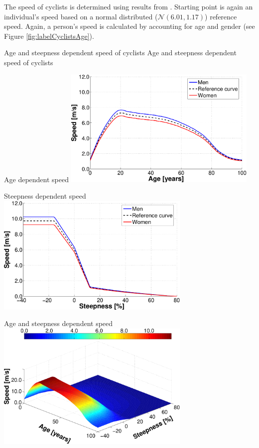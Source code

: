 The speed of cyclists is determined using results from \cite{ParkinRotheram_TPol_2010}. Starting point is again an individual's speed based on a normal distributed ($\mathcal{N}(6.01,1.17)$) reference speed. Again, a person's speed is calculated by accounting for age and gender (see Figure \ref{fig:labelCyclistsAge}).

\createfigure%
{Age and steepness dependent speed of cyclists}%
{Age and steepness dependent speed of cyclists}%
{\label{fig:labelBikeTravelTimes}}%
{%
  \createsubfigure%
  {Age dependent speed}%
  {\includegraphics[width=0.70\textwidth, angle=0]{extending/figures/MultiModalSimulation/cyclistsAge}}%
  {\label{fig:labelCyclistsAge}}%
  {\vspace{5mm}}%

  \createsubfigure%
  {Steepness dependent speed}%
  {\includegraphics[width=0.70\textwidth, angle=0]{extending/figures/MultiModalSimulation/cyclistsSteepness}}%
  {\label{fig:labelCyclistsSteepness}}%
  {\vspace{4mm}}%

  \createsubfigure%
  {Age and steepness dependent speed}%
  {\includegraphics[width=0.70\textwidth, angle=0]{extending/figures/MultiModalSimulation/cyclists3d}}%
  {\label{fig:labelCyclistsAgeSteepness3d}}%
  {}%
}%
{}
\afterpage{\clearpage}	%

